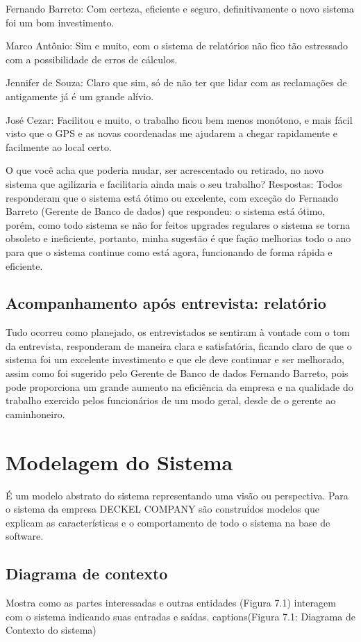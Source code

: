 Fernando Barreto: Com certeza, eficiente e seguro, definitivamente o novo sistema foi um bom investimento.

Marco Antônio: Sim e muito, com o sistema de relatórios não fico tão estressado com a possibilidade de erros de cálculos.

Jennifer de Souza: Claro que sim, só de não ter que lidar com as reclamações de antigamente já é um grande alívio.

José Cezar: Facilitou e muito, o trabalho ficou bem menos monótono, e mais fácil visto que o GPS e as novas coordenadas me ajudarem a chegar rapidamente e facilmente ao local certo.

O que você acha que poderia mudar, ser acrescentado ou retirado, no novo sistema que agilizaria e facilitaria ainda mais o seu trabalho?
Respostas:
Todos responderam que o sistema está ótimo ou excelente, com exceção do Fernando Barreto (Gerente de Banco de dados) que respondeu: o sistema está ótimo, porém, como todo sistema se não for feitos upgrades regulares o sistema se torna obsoleto e ineficiente, portanto, minha sugestão é que fação melhorias todo o ano para que o sistema continue como está agora, funcionando de forma rápida e eficiente.

\subsection{Acompanhamento após entrevista: relatório}

Tudo ocorreu como planejado, os entrevistados se sentiram à vontade com o tom da entrevista, responderam de maneira clara e satisfatória, ficando claro de que o sistema foi um excelente investimento e que ele deve continuar e ser melhorado, assim como foi sugerido pelo Gerente de Banco de dados Fernando Barreto, pois pode proporciona um grande aumento na eficiência da empresa e na qualidade do trabalho exercido pelos funcionários de um modo geral, desde de o gerente ao caminhoneiro.

\section{Modelagem do Sistema}
É um modelo abstrato do sistema representando uma visão ou perspectiva. Para o sistema da empresa DECKEL COMPANY são construídos modelos que explicam as características e o comportamento de todo o sistema na base de software.

\subsection{Diagrama de contexto}
Mostra como as partes interessadas e outras entidades (Figura 7.1) interagem com o sistema indicando suas entradas e saídas.
captions(Figura 7.1: Diagrama de Contexto do sistema)

